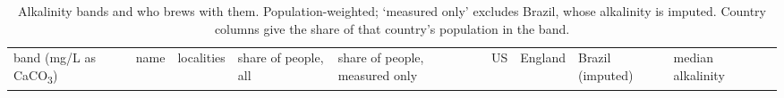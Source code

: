 \documentclass[
  a4paper,
]{article}
\begin{document}
\begin{longtable}[]{@{}
  >{\raggedright\arraybackslash}p{}
  >{\raggedright\arraybackslash}p{}
  >{\raggedright\arraybackslash}p{}
  >{\raggedright\arraybackslash}p{}
  >{\raggedright\arraybackslash}p{}
  >{\raggedright\arraybackslash}p{}
  >{\raggedright\arraybackslash}p{}
  >{\raggedright\arraybackslash}p{}
  >{\raggedright\arraybackslash}p{}
  >{\raggedright\arraybackslash}p{}@{}}
\caption{Alkalinity bands and who brews with them. Population-weighted;
`measured only' excludes Brazil, whose alkalinity is imputed. Country
columns give the share of that country's population in the
band.}\label{tbl-bands}\tabularnewline
\toprule\noalign{}
\begin{minipage}[b]{\linewidth}\raggedright
band (mg/L as CaCO\textsubscript{3})
\end{minipage} & \begin{minipage}[b]{\linewidth}\raggedright
name
\end{minipage} & \begin{minipage}[b]{\linewidth}\raggedright
localities
\end{minipage} & \begin{minipage}[b]{\linewidth}\raggedright
share of people, all
\end{minipage} & \begin{minipage}[b]{\linewidth}\raggedright
share of people, measured only
\end{minipage} & \begin{minipage}[b]{\linewidth}\raggedright
US
\end{minipage} & \begin{minipage}[b]{\linewidth}\raggedright
England
\end{minipage} & \begin{minipage}[b]{\linewidth}\raggedright
Brazil (imputed)
\end{minipage} & \begin{minipage}[b]{\linewidth}\raggedright
median alkalinity
\end{minipage} & \begin{minipage}[b]{\linewidth}\raggedright

\end{minipage}
\end{longtable}
\end{document}
